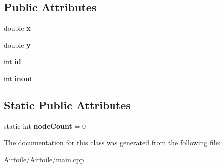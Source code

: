 \subsection*{Public Attributes}
\begin{DoxyCompactItemize}
\item 
\mbox{\label{class_node_a1082fca4b71cc3cc02d78c35108f9059}} 
double {\bfseries x}
\item 
\mbox{\label{class_node_a441d3c5ba86597f4c391408d9fe6d242}} 
double {\bfseries y}
\item 
\mbox{\label{class_node_a59a543130a10c95f1e8642cf8c5645e8}} 
int {\bfseries id}
\item 
\mbox{\label{class_node_aa1b7eaa8495d1f09c76815e9cfb014af}} 
int {\bfseries inout}
\end{DoxyCompactItemize}
\subsection*{Static Public Attributes}
\begin{DoxyCompactItemize}
\item 
\mbox{\label{class_node_a5497ed023382d8e370ad72d758587927}} 
static int {\bfseries node\+Count} = 0
\end{DoxyCompactItemize}


The documentation for this class was generated from the following file\+:\begin{DoxyCompactItemize}
\item 
Airfoile/\+Airfoile/main.\+cpp\end{DoxyCompactItemize}
